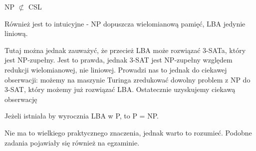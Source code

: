 \begin{lemma}
    NP \( \not \subset \) CSL
\end{lemma}

Również jest to intuicyjne - NP dopuszcza wielomianową pamięć, LBA jedynie liniową.

Tutaj można jednak zauważyć, że przecież LBA może rozwiązać 3-SATa, który jest NP-zupełny. Jest to prawda, jednak 3-SAT jest NP-zupełny względem redukcji wielomianowej, nie liniowej.
Prowadzi nas to jednak do ciekawej obserwacji: możemy na maszynie Turinga zredukować dowolny problem z NP do 3-SAT, który możemy już rozwiązać LBA. Ostatecznie uzyskujemy ciekawą obserwację

\begin{corollary}
    Jeżeli istniała by wyrocznia LBA w P, to P = NP.
\end{corollary}

Nie ma to wielkiego praktycznego znaczenia, jednak warto to rozumieć. Podobne zadania pojawiały się również na egzaminie.
